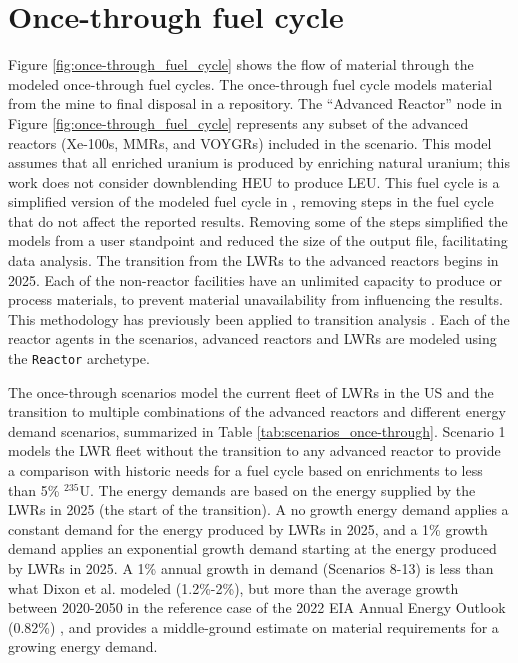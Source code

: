 \section{Once-through fuel cycle} \label{sec:once-through-methods}
Figure \ref{fig:once-through_fuel_cycle} shows the flow of material through 
the modeled once-through fuel cycles. The once-through fuel cycle models 
material from the mine to final disposal in a repository. The 
``Advanced Reactor'' node in Figure 
\ref{fig:once-through_fuel_cycle} represents any subset of the advanced 
reactors (Xe-100s, \glspl{MMR}, and VOYGRs) included 
in the scenario. This model assumes that all enriched uranium is produced 
by enriching natural uranium; this work does not consider downblending \gls{HEU} 
to produce \gls{LEU}. 
This fuel cycle is a simplified version of the modeled fuel cycle in 
\cite{bachmann_enrichment_2021}, removing steps in the fuel cycle that 
do not affect the reported results. Removing some of the steps simplified 
the models from a user standpoint and reduced the size of the \Cyclus 
output file, facilitating data analysis. The transition from the 
\glspl{LWR} to the advanced reactors begins in 2025. Each of the non-reactor 
facilities have an unlimited capacity to produce or process materials,
to prevent material unavailability from influencing the results. 
This methodology has previously been applied to transition analysis 
\cite{djokic_application_2015}. Each of the reactor agents in the scenarios, 
advanced reactors and \glspl{LWR} are modeled using the \Cycamore 
\texttt{Reactor} archetype.



The once-through scenarios model the current fleet of \glspl{LWR} in the 
US and the transition to multiple combinations of the advanced reactors 
and different energy demand scenarios, summarized in Table 
\ref{tab:scenarios_once-through}. Scenario 1 models the \gls{LWR} fleet 
without the transition to any advanced reactor to provide a comparison with 
historic needs for a fuel cycle based on enrichments to less than 5\% $^{235}$U. 
The energy demands are based on the energy supplied by the \glspl{LWR} in 
2025 (the start of the transition). A no growth energy demand applies a 
constant demand for the energy produced by \glspl{LWR} in 2025, and a 1\% 
growth demand applies an exponential growth demand starting at the energy 
produced by \glspl{LWR} in 2025. A 1\% annual growth in demand (Scenarios 8-13) 
is less than what Dixon et al. \cite{dixon_estimated_2022} modeled
(1.2\%-2\%), but more than the average growth between 2020-2050 in the 
reference case of the 2022 \gls{EIA} Annual Energy Outlook (0.82\%)
\cite{us_energy_information_administration_annual_2022} , and 
provides a middle-ground estimate on material requirements for a growing 
energy demand. 

